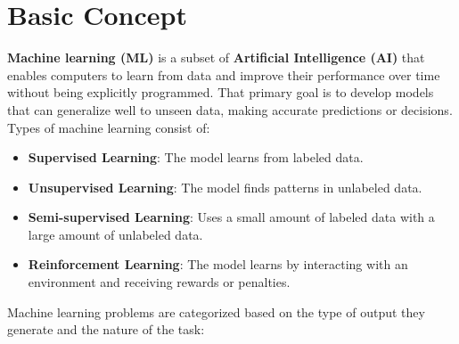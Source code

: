 \section{Basic Concept}\label{sec:basic-concept}

\textbf{Machine learning (ML)} is a subset of \textbf{Artificial Intelligence (AI)} that enables computers to learn from data and improve their performance over time without being explicitly programmed.
That primary goal is to develop models that can generalize well to unseen data, making accurate predictions or decisions.
Types of machine learning consist of:

\begin{itemize}
    \item { \textbf{Supervised Learning}: The model learns from labeled data. }
    \item { \textbf{Unsupervised Learning}: The model finds patterns in unlabeled data. }
    \item { \textbf{Semi-supervised Learning}: Uses a small amount of labeled data with a large amount of unlabeled data. }
    \item { \textbf{Reinforcement Learning}: The model learns by interacting with an environment and receiving rewards or penalties. }
\end{itemize}

Machine learning problems are categorized based on the type of output they generate and the nature of the task:

